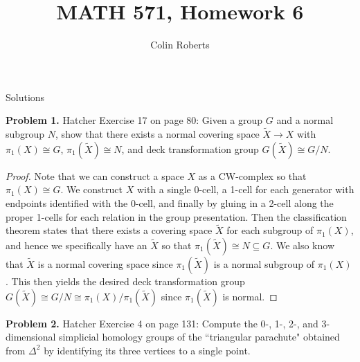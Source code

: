 \documentclass[leqno]{article}
\author{Colin Roberts}
\title{MATH 571, Homework 6}
\theoremstyle{nonumberplain}
\newtheorem{proof}{Proof}
\begin{document}
\maketitle
\begin{large}
\begin{center}
Solutions
\end{center}
\end{large}


\noindent\textbf{Problem 1.} 
Hatcher Exercise 17 on page 80: Given a group $G$ and a normal subgroup $N$, show that there exists a normal covering space $\tilde{X}\to X$ with $\pi_1(X)\cong G$, $\pi_1(\tilde{X})\cong N$, and deck transformation group $G(\tilde{X})\cong G/N$.


\begin{proof}
Note that we can construct a space $X$ as a CW-complex so that $\pi_1(X)\cong G$. We construct $X$ with a single 0-cell, a 1-cell for each generator with endpoints identified with the 0-cell, and finally by gluing in a 2-cell along the proper 1-cells for each relation in the group presentation. Then the classification theorem states that there exists a covering space $\tilde{X}$ for each subgroup of $\pi_1(X)$, and hence we specifically have an $\tilde{X}$ so that $\pi_1(\tilde{X})\cong N \subseteq G$. We also know that $\tilde{X}$ is a normal covering space since $\pi_1(\tilde{X})$ is a normal subgroup of $\pi_1(X)$. This then yields the desired deck transformation group $G(\tilde{X}) \cong G/N \cong \pi_1(X)/\pi_1(\tilde{X})$ since $\pi_1(\tilde{X})$ is normal.  
\end{proof}

\vspace*{1cm}


\noindent\textbf{Problem 2.} Hatcher Exercise 4 on page 131: Compute the 0-, 1-, 2-, and 3-dimensional simplicial homology groups of the ``triangular parachute" obtained from $\Delta^2$ by identifying its three vertices to a single point.
\end{document}
